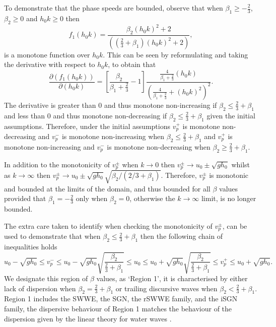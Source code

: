 \documentclass[10pt]{elsarticle}
\begin{document}
To demonstrate that the phase speeds are bounded, observe that when $\beta_1 \ge -\frac{2}{3}$, $\beta_2 \ge 0$ and $h_0 k \ge 0$ then
\begin{equation*}
f_1(h_0k) = \dfrac{\beta_2 \left(h_0 k\right)^2 + 2}{\left( \left(\frac{2}{3} + \beta_1\right) \left(h_0 k\right)^2 + 2\right)},
\end{equation*}
is a monotone function over $h_0 k$. This can be seen by reformulating and taking the derivative with respect to $h_0 k$, to obtain that 
\begin{equation*}
 \frac{\partial \left(f_1(h_0k)\right)}{\partial \left(h_0 k\right)} = \left[\frac{\beta_2}{\beta_1 + \frac{2}{3}} - 1\right] \dfrac{ \frac{4}{\beta_1 + \frac{2}{3}} \left(h_0 k\right)}{\left( \frac{4}{\beta_1 + \frac{2}{3}} + \left(h_0 k\right)^2\right)^2}.
\end{equation*}
The derivative is greater than $0$ and thus monotone non-increasing if $\beta_2 \le \frac{2}{3} + \beta_1$ and less than $0$ and thus monotone non-decreasing if $\beta_2 \le \frac{2}{3} + \beta_1$  given the initial assumptions. Therefore, under the initial assumptions $v^+_p$ is monotone non-decreasing and $v^-_p$ is monotone non-increasing when $\beta_2 \le \frac{2}{3} + \beta_1$ and $v^+_p$ is monotone non-increasing and $v^-_p$ is monotone non-decreasing when $\beta_2 \ge \frac{2}{3} + \beta_1$. 

In addition to the monotonicity of $v^\pm_p$ when $k \rightarrow 0$ then $v^\pm_p \rightarrow u_0 \pm \sqrt{gh_0}$ whilst as $k \rightarrow \infty$ then $v^\pm_p \rightarrow u_0 \pm \sqrt{gh_0} \sqrt{{\beta_2}/ \left(2/3 + \beta_1 \right)}$. Therefore, $v^\pm_p$ is monotonic and bounded at the limits of the domain, and thus bounded for all $\beta$ values provided that $\beta_1 = -\frac{2}{3}$ only when $\beta_2 = 0$, otherwise the $k \rightarrow \infty$ limit, is no longer bounded.

The extra care taken to identify when checking the monotonicity of $v^\pm_p$, can be used to demonstrate that when ${\beta_2} \le \frac{2}{3} + \beta_1$ then the following chain of inequalities holds 
\begin{equation}
u_0 -  \sqrt{gh_0} \le  v^-_p \le u_0 - \sqrt{gh_0} \sqrt{\dfrac{\beta_2}{\frac{2}{3} + \beta_1}} \le u_0 \le u_0 + \sqrt{gh_0} \sqrt{\dfrac{\beta_2}{\frac{2}{3} + \beta_1}} \le   v^+_p  \le u_0 +   \sqrt{gh_0}.
\end{equation}
We designate this region of $\beta$ values, as `Region 1', it is characterised by either lack of dispersion when $\beta_2 = \frac{2}{3} + \beta_1$ or trailing discursive waves when $\beta_2 < \frac{2}{3} + \beta_1$. Region 1 includes the SWWE, the SGN, the rSWWE family, and the iSGN family, the dispersive behaviour of Region 1 matches the behaviour of the dispersion given by the linear theory for water waves \cite{Whitham-1967-399}. 
\end{document}

